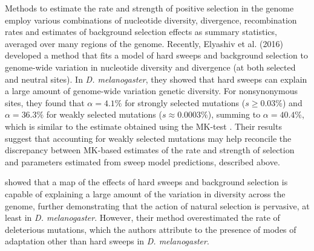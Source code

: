 	Methods to estimate the rate and strength of positive selection in the genome employ various combinations of nucleotide diversity, divergence, recombination rates and estimates of background selection effects as summary statistics, averaged over many regions of the genome. Recently, Elyashiv et al. (2016) developed a method that fits a model of hard sweeps and background selection to genome-wide variation in nucleotide diversity and divergence (at both selected and neutral sites). In \textit{D. melanogaster}, they showed that hard sweeps can explain a large amount of genome-wide variation genetic diversity. For nonsynonymous sites, they found that $\alpha = 4.1\%$ for strongly selected mutations ($s \geq 0.03\%$) and $\alpha = 36.3\%$ for weakly selected mutations ($s \approx 0.0003\%$), summing to $\alpha = 40.4\%$, which is similar to the estimate obtained using the MK-test \citep{RN283}. Their results suggest that accounting for weakly selected mutations may help reconcile the discrepancy between MK-based estimates of the rate and strength of selection and parameters estimated from sweep model predictions, described above.

\cite{RN274} showed that a map of the effects of hard sweeps and background selection is capable of explaining a large amount of the variation in diversity across the genome, further demonstrating that the action of natural selection is pervasive, at least in \textit{D. melanogaster}. However, their method overestimated the rate of deleterious mutations, which the authors attribute to the presence of modes of adaptation other than hard sweeps in \textit{D. melanogaster}. 
